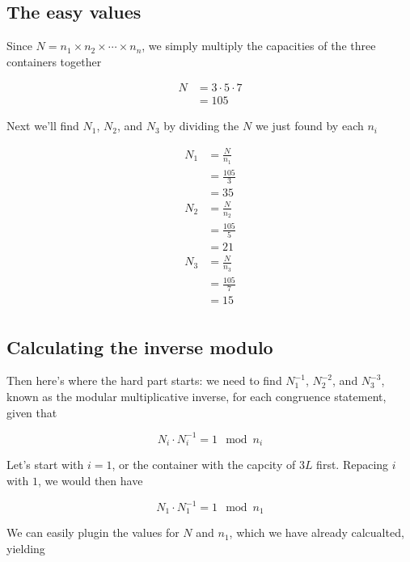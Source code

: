 \documentclass[index]{subfiles}
\begin{document}
\subsection{The easy values}

Since \(N=n_1\times n_2\times\cdots\times n_n\), we simply multiply the capacities of the three containers together

\begin{align*}
    N&=3\cdot5\cdot7\\
    &=\boxed{105}
\end{align*}

Next we'll find \(N_1\), \(N_2\), and \(N_3\) by dividing the \(N\) we just found by each \(n_i\)

\begin{align*}
    N_1&=\frac{N}{n_1}\\
    &=\frac{105}{3}\\
    &=\boxed{35}\\
    N_2&=\frac{N}{n_2}\\
    &=\frac{105}{5}\\
    &=\boxed{21}\\
    N_3&=\frac{N}{n_3}\\
    &=\frac{105}{7}\\
    &=\boxed{15}\\
\end{align*}

\subsection{Calculating the inverse modulo}

Then here's where the hard part starts: we need to find \(N_1^{-1}\), \(N_2^{-2}\), and \(N_3^{-3}\), known as the modular multiplicative inverse, for each congruence statement, given that 

\begin{equation*}
    N_i\cdot N_i^{-1}=1\mod n_i
\end{equation*}

Let's start with \(i=1\), or the container with the capcity of \(3L\) first. Repacing \(i\) with \(1\), we would then have

\begin{equation*}
    N_1\cdot N_1^{-1}=1\mod n_1
\end{equation*}

We can easily plugin the values for \(N\) and \(n_1\), which we have already calcualted, yielding
\end{document}
